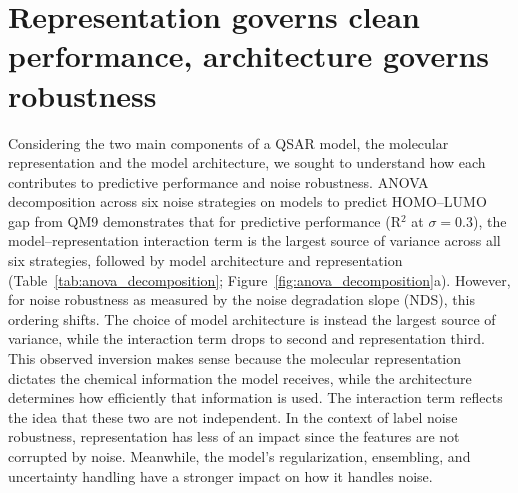 \section{Representation governs clean performance, architecture governs robustness}


Considering the two main components of a QSAR model, the molecular representation and the model architecture, we sought to understand how each contributes to predictive performance and noise robustness. ANOVA decomposition across six noise strategies on models to predict HOMO--LUMO gap from QM9 demonstrates that for predictive performance (R$^2$ at $\sigma = 0.3$), the model--representation interaction term is the  largest source of variance across all six strategies, followed by model architecture and representation (Table~\ref{tab:anova_decomposition}; Figure~\ref{fig:anova_decomposition}a). However, for noise robustness as measured by the noise degradation slope (NDS), this ordering shifts. The choice of model architecture is instead the largest source of variance, while the interaction term drops to second and representation third. This observed inversion makes sense because the molecular representation dictates the chemical information the model receives, while the architecture determines how efficiently that information is used. The interaction term reflects the idea that these two are not independent. In the context of label noise robustness, representation has less of an impact since the features are not corrupted by noise. Meanwhile, the model's regularization, ensembling, and uncertainty handling have a stronger impact on how it handles noise. 


